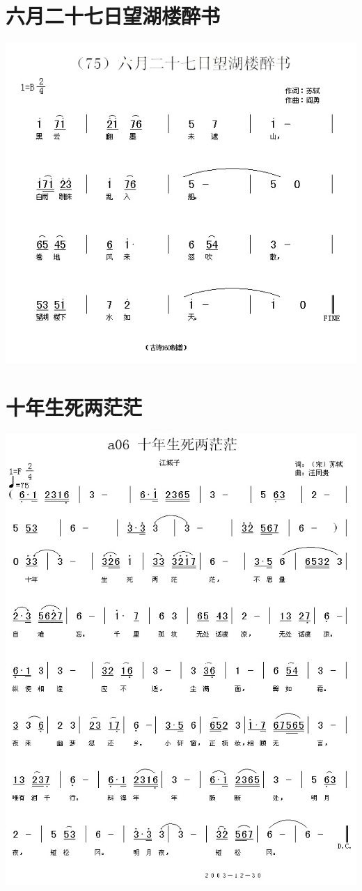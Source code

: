 \documentclass[cn,pad,chinesefont=nofont,twocol]{elegantbook}
\begin{document}
\section{六月二十七日望湖楼醉书}
    \includegraphics[width=\textwidth]{dongxiao/20200627-苏轼-六月二十七日望湖楼醉书.jpg} 
\section{十年生死两茫茫}
    \includegraphics[width=\textwidth]{dongxiao/20200627-苏轼-十年生死两茫茫.jpg} 
\end{document}
